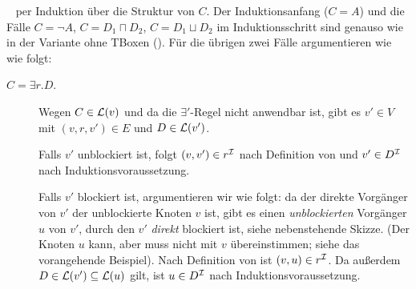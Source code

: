 \documentclass[fontsize=11pt, twoside=false, numbers=autoenddot]{scrbook}
\begin{document}
\par\medskip
{}~
per Induktion über die Struktur von $C$.
Der Induktionsanfang ($C=A$) und die Fälle $C=\lnot A$, $C = D_1 \sqcap D_2$,
$C = D_1 \sqcup D_2$ im Induktionsschritt sind genauso wie in der Variante ohne TBoxen
(\textsf{\hyperlink{TBewKorrTableauxOhne}{\TBewKorrTableauxOhne}}). Für die übrigen zwei Fälle argumentieren wie wie folgt:
%
  \begin{description}
    \item[{\boldmath $C = \exists r.D$.}]
      Wegen $C \in \mathcal{L}(v)$
      und da die $\exists'$-Regel nicht anwendbar ist,
      gibt es $v' \in V$ mit $(v,r,v') \in E$ und $D \in \mathcal{L}(v')$.
      
      Falls $v'$ unblockiert ist, folgt $(v,v') \in r^\mathcal{I}$ nach Definition von \Imc
      und $v' \in D^\mathcal{I}$ nach Induktionsvoraussetzung.

      \parbox{.78\linewidth}{%
        Falls $v'$ blockiert ist, argumentieren wir wie folgt:
        da der direkte Vorgänger von $v'$ der unblockierte Knoten $v$ ist,
        gibt es einen \emph{unblockierten} Vorgänger $u$ von $v'$,
        durch den $v'$ \emph{direkt} blockiert ist,
        siehe nebenstehende Skizze.
        (Der Knoten $u$ kann, aber muss nicht mit $v$ übereinstimmen;
        siehe das vorangehende Beispiel).
        Nach Definition von \Imc ist $(v,u) \in r^\mathcal{I}$.
        Da außerdem $D \in \mathcal{L}(v') \subseteq \mathcal{L}(u)$ gilt,
        ist $u \in D^\mathcal{I}$ nach Induktionsvoraussetzung.%
      }%
      \hfill
      \parbox{.14\linewidth}{%
        }
\end{description}
\end{document}
